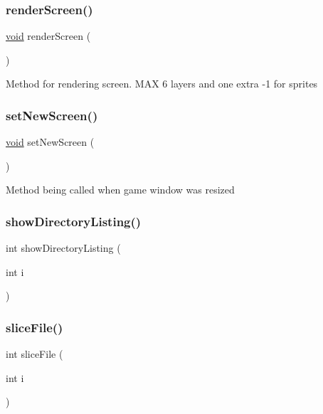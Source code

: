 \subsubsection{\texorpdfstring{render\+Screen()}{renderScreen()}}
{\footnotesize\ttfamily \hyperlink{png_8h_ac9c84fa68bbad002983e35ce3663c686}{void} render\+Screen (\begin{DoxyParamCaption}{ }\end{DoxyParamCaption})}

Method for rendering screen. M\+AX 6 layers and one extra -\/1 for sprites \mbox{\label{group___core_ga235968ecd656b8f1436aebad7eeaa5b8}} 
\subsubsection{\texorpdfstring{set\+New\+Screen()}{setNewScreen()}}
{\footnotesize\ttfamily \hyperlink{png_8h_ac9c84fa68bbad002983e35ce3663c686}{void} set\+New\+Screen (\begin{DoxyParamCaption}{ }\end{DoxyParamCaption})}

Method being called when game window was resized \mbox{\label{group___core_ga70bec60930d92e442620c4cbe2232606}} 
\subsubsection{\texorpdfstring{show\+Directory\+Listing()}{showDirectoryListing()}}
{\footnotesize\ttfamily int show\+Directory\+Listing (\begin{DoxyParamCaption}\item[{int}]{i }\end{DoxyParamCaption})}

\mbox{\label{group___core_ga3c412437d5338d1b9242ca728ec3fa6a}} 
\subsubsection{\texorpdfstring{slice\+File()}{sliceFile()}}
{\footnotesize\ttfamily int slice\+File (\begin{DoxyParamCaption}\item[{int}]{i }\end{DoxyParamCaption})}

